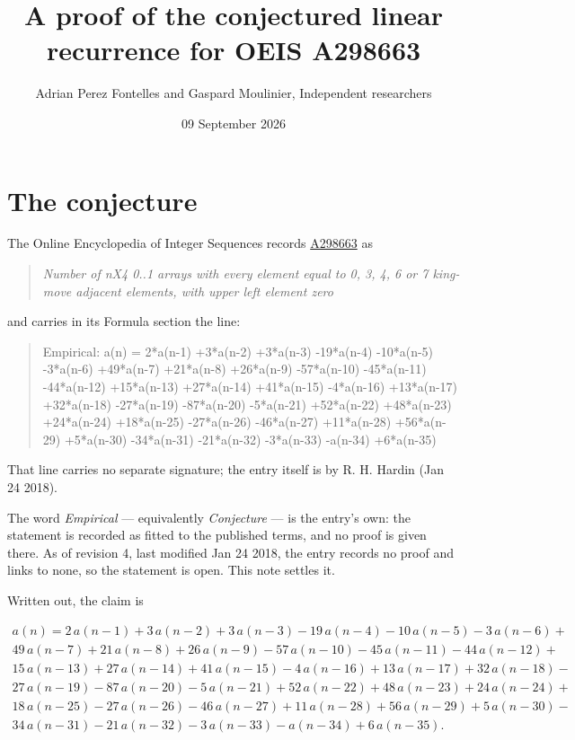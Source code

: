 \documentclass[11pt]{article}
\title{A proof of the conjectured linear recurrence for OEIS A298663}
\author{Adrian Perez Fontelles and Gaspard Moulinier, Independent researchers}
\date{09 September 2026}
\theoremstyle{definition}
\begin{document}
\maketitle
\section{The conjecture}

The Online Encyclopedia of Integer Sequences records \href{https://oeis.org/A298663}{A298663} as

\begin{quote}\itshape Number of nX4 0..1 arrays with every element equal to 0, 3, 4, 6 or 7 king-move adjacent elements, with upper left element zero\end{quote}

and carries in its Formula section the line:

\begin{quote}\ttfamily Empirical: a(n) = 2*a(n-1) +3*a(n-2) +3*a(n-3) -19*a(n-4) -10*a(n-5) -3*a(n-6) +49*a(n-7) +21*a(n-8) +26*a(n-9) -57*a(n-10) -45*a(n-11) -44*a(n-12) +15*a(n-13) +27*a(n-14) +41*a(n-15) -4*a(n-16) +13*a(n-17) +32*a(n-18) -27*a(n-19) -87*a(n-20) -5*a(n-21) +52*a(n-22) +48*a(n-23) +24*a(n-24) +18*a(n-25) -27*a(n-26) -46*a(n-27) +11*a(n-28) +56*a(n-29) +5*a(n-30) -34*a(n-31) -21*a(n-32) -3*a(n-33) -a(n-34) +6*a(n-35)\end{quote}

That line carries no separate signature; the entry itself is by R. H. Hardin (Jan 24 2018).

The word {\itshape Empirical} --- equivalently {\itshape Conjecture} --- is the entry's own: the statement is recorded as fitted to the published terms, and no proof is given there. As of revision 4, last modified Jan 24 2018, the entry records no proof and links to none, so the statement is open. This note settles it.

Written out, the claim is

\begin{multline*} a(n) = 2\,a(n-1) + 3\,a(n-2) + 3\,a(n-3) - 19\,a(n-4) - 10\,a(n-5) - 3\,a(n-6) + \\ 49\,a(n-7) + 21\,a(n-8) + 26\,a(n-9) - 57\,a(n-10) - 45\,a(n-11) - 44\,a(n-12) + \\ 15\,a(n-13) + 27\,a(n-14) + 41\,a(n-15) - 4\,a(n-16) + 13\,a(n-17) + 32\,a(n-18) - \\ 27\,a(n-19) - 87\,a(n-20) - 5\,a(n-21) + 52\,a(n-22) + 48\,a(n-23) + 24\,a(n-24) + \\ 18\,a(n-25) - 27\,a(n-26) - 46\,a(n-27) + 11\,a(n-28) + 56\,a(n-29) + 5\,a(n-30) - \\ 34\,a(n-31) - 21\,a(n-32) - 3\,a(n-33) - a(n-34) + 6\,a(n-35). \end{multline*}
\end{document}
